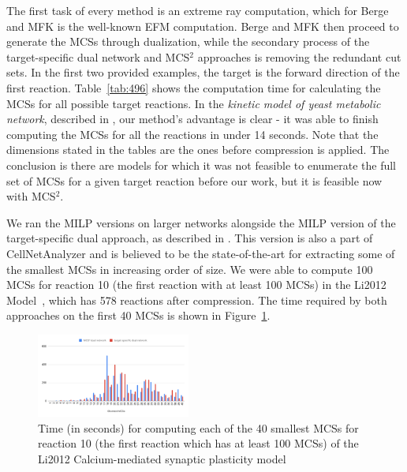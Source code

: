 \documentclass{bioinfo}
\theoremstyle{plain}
\theoremstyle{definition}
\begin{document}
The first task of every method is an extreme ray computation, which for Berge and MFK is the well-known EFM computation. Berge and MFK then proceed to generate the MCSs through dualization, while the secondary process of the target-specific dual network and MCS$^2$ approaches is removing the redundant cut sets. In the first two provided examples, the target is the forward direction of the first reaction. Table~\ref{tab:496} shows the computation time for calculating the MCSs for all possible target reactions. In the \textit{kinetic model of yeast metabolic network}, described in \cite{ModelConstruction}, our method's advantage is clear - it was able to finish computing the MCSs for all the reactions in under 14 seconds. Note that the dimensions stated in the tables are the ones before compression is applied. The conclusion is there are models for which it was not feasible to enumerate the full set of MCSs for a given target reaction before our work, but it is feasible now with MCS$^2$.

We ran the MILP versions on larger networks alongside the MILP version of the target-specific dual approach, as described in \cite{MCSs-MILP-Dual}. This version is also a part of CellNetAnalyzer and is believed to be the state-of-the-art for extracting some of the smallest MCSs in increasing order of size. We were able to compute 100 MCSs for reaction 10 (the first reaction with at least 100 MCSs) in the Li2012 Model~\cite{Li2012}, which has 578 reactions after compression. The time required by both approaches on the first 40 MCSs is shown in Figure~\ref{fig:BIOMD6000000628}.
\begin{figure}
    \centering
        \includegraphics[width=0.45\textwidth]{figs/time.pdf}
    \caption{Time (in seconds) for computing each of the 40 smallest MCSs for reaction 10 (the first reaction which has at least 100 MCSs) of the Li2012 Calcium-mediated synaptic plasticity model \cite{Li2012}}
    \label{fig:BIOMD6000000628}
    \vspace{-0.5cm}
\end{figure}
\end{document}
